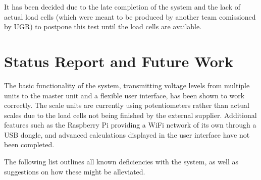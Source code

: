 It has been decided due to the late completion of the system and the lack of actual load cells (which were meant to be produced by another team comissioned by UGR) to postpone this test until the load cells are available.

\section{Status Report and Future Work}
The basic functionality of the system, transmitting voltage levels from multiple units to the master unit and a flexible user interface, has been shown to work correctly. The scale units are currently using potentiometers rather than actual scales due to the load cells not being finished by the external supplier. Additional features such as the Raspberry Pi providing a WiFi network of its own through a USB dongle, and advanced calculations displayed in the user interface have not been completed.

The following list outlines all known deficiencies with the system, as well as suggestions on how these might be alleviated.


